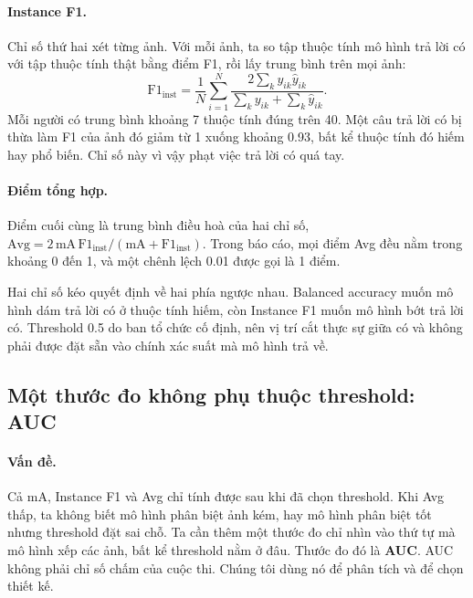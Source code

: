 \documentclass[11pt,a4paper]{article}
\newcommand{\Avg}{\mathrm{Avg}}
\newcommand{\mA}{\mathrm{mA}}
\newcommand{\IF}{\mathrm{F1}_{\mathrm{inst}}}
\begin{document}
\paragraph{Instance F1.} Chỉ số thứ hai xét từng ảnh. Với mỗi ảnh, ta so tập thuộc tính mô hình trả lời có với tập thuộc tính thật bằng điểm F1, rồi lấy trung bình trên mọi ảnh:
\begin{equation}
\IF=\frac{1}{N}\sum_{i=1}^{N}\frac{2\sum_k y_{ik}\hat y_{ik}}{\sum_k y_{ik}+\sum_k \hat y_{ik}}.
\end{equation}
Mỗi người có trung bình khoảng 7 thuộc tính đúng trên 40. Một câu trả lời có bị thừa làm F1 của ảnh đó giảm từ 1 xuống khoảng 0.93, bất kể thuộc tính đó hiếm hay phổ biến. Chỉ số này vì vậy phạt việc trả lời có quá tay.

\paragraph{Điểm tổng hợp.} Điểm cuối cùng là trung bình điều hoà của hai chỉ số, $\Avg = 2\,\mA\,\IF/(\mA+\IF)$. Trong báo cáo, mọi điểm Avg đều nằm trong khoảng 0 đến 1, và một chênh lệch 0.01 được gọi là 1 điểm.

\begin{ghichu}
Hai chỉ số kéo quyết định về hai phía ngược nhau. Balanced accuracy muốn mô hình dám trả lời có ở thuộc tính hiếm, còn Instance F1 muốn mô hình bớt trả lời có. Threshold 0.5 do ban tổ chức cố định, nên vị trí cắt thực sự giữa có và không phải được đặt sẵn vào chính xác suất mà mô hình trả về.
\end{ghichu}

\subsection{Một thước đo không phụ thuộc threshold: AUC}
\label{sec:auc}

\paragraph{Vấn đề.} Cả mA, Instance F1 và Avg chỉ tính được sau khi đã chọn threshold. Khi Avg thấp, ta không biết mô hình phân biệt ảnh kém, hay mô hình phân biệt tốt nhưng threshold đặt sai chỗ. Ta cần thêm một thước đo chỉ nhìn vào thứ tự mà mô hình xếp các ảnh, bất kể threshold nằm ở đâu. Thước đo đó là \textbf{AUC}. AUC không phải chỉ số chấm của cuộc thi. Chúng tôi dùng nó để phân tích và để chọn thiết kế.
\end{document}
